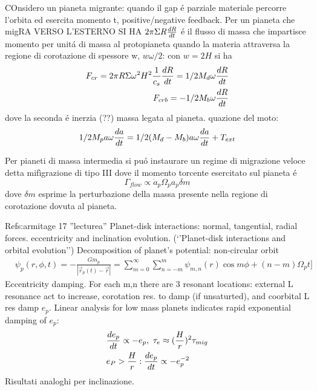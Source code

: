 \begin{workout}
COnsidero un pianeta migrante: quando il gap \'e parziale materiale percorre l'orbita ed esercita momento t, positive/negative feedback.
Per un pianeta che migRA VERSO L'ESTERNO SI HA
$2\pi\Sigma R\TDy{t}{R}$ \'e il flusso di massa che impartisce momento per unit\'a di massa al protopianeta quando la materia attraversa la regione di corotazione di spessore w, $w\omega/2$: con $w=2H$ si ha
\begin{align}
F_{cr}=2\pi R\Sigma\omega^2 H^2\frac{1}{c_s}\TDy{t}{R}=1/2M_d\omega\TDy{t}{R}\\
F_{crb}=-1/2M_b\omega\TDy{t}{R}
\end{align}
dove la seconda \'e inerzia (??) massa legata al pianeta.
quazione del moto:
\begin{equation}
1/2M_pa\omega\TDy{t}{a}=1/2(M_d-M_b)a\omega\TDy{t}{a}+T_{ext}
\end{equation}
\end{workout}

Per pianeti di massa intermedia si pu\'o instaurare un regime di migrazione veloce detta mifìgrazione di tipo III dove il momento torcente esercitato sul pianeta \'e
\begin{equation}
\Gamma_{flow}\propto\dot{a}_p\Omega_pa_p\delta m
\end{equation}
dove $\delta m$ esprime la perturbazione della massa presente nella regione di corotazione dovuta al pianeta.

\begin{workout}
Refs:armitage 17 ''lecturea''
Planet-disk interactions: normal, tangential, radial forces. eccentricity and inclination evolution. (‘’Planet-disk interactions and orbital evolution’’)
Decomposition of planet’s potential: non-circular orbit
\begin{align*}
&\psi_p(r,\phi,t)=-\frac{Gm_p}{|\vec{r}_p(t)-\vec{r}|}=\sum_{m=0}^{\infty}\sum_{n=-m}^m\psi_{m,n}(r)\cos{m\phi+(n-m)\Omega_pt]}
\end{align*}
Eccentricity damping.
For each m,n there are 3 resonant locations: external L resonance act to increase, corotation res. to damp (if unsaturted), and coorbital L res damp $e_p$. Linear analysis for low mass planets indicates rapid exponential damping of $e_p$:
\begin{align*}
&\TDy{t}{e_p}\propto-e_p,\ \tau_e\approx(\frac{H}{r})^2\tau_{mig}\\
&e_P>\frac{H}{r}: \TDy{t}{e_p}\propto-e_p\expy{-2}
\end{align*}
Risultati analoghi per inclinazione.	
\end{workout}


